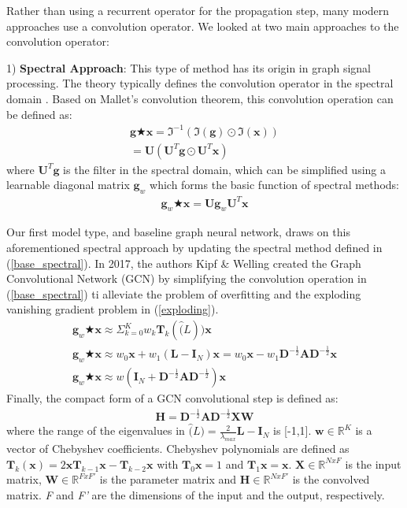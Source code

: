 \documentclass[sigconf, nonacm]{acmart}
\begin{document}
Rather than using a recurrent operator for the propagation step, many modern approaches use a convolution operator. We looked at two main approaches to the convolution operator:

1) \textbf{Spectral Approach}: This type of method has its origin in graph signal processing. The theory typically defines the convolution operator in the spectral domain \cite{Mallet1999}. Based on Mallet's convolution theorem, this convolution operation can be defined as:
\begin{align}
    \mathbf{g} \bigstar \mathbf{x} = \Im^{-1} ( \Im (\mathbf{g}) \odot \Im (\mathbf{x})) \\
    = \mathbf{U}(\mathbf{U}^T\mathbf{g} \odot \mathbf{U}^T\mathbf{x})
\end{align}
where $\mathbf{U}^T\mathbf{g}$ is the filter in the spectral domain, which can be simplified using a learnable diagonal matrix $\mathbf{g}_w$ which forms the basic function of spectral methods:
\begin{align}
    \mathbf{g}_w \bigstar \mathbf{x} = \mathbf{U}\mathbf{g}_w \mathbf{U}^T\mathbf{x}
    \label{base_spectral}
\end{align} 

Our first model type, and baseline graph neural network, draws on this aforementioned spectral approach by updating the spectral method defined in (\ref{base_spectral}). In 2017, the authors Kipf \& Welling created the Graph Convolutional Network (\textsc{GCN}) \cite{Kipf&Welling2017} by simplifying the convolution operation in (\ref{base_spectral}) ti alleviate the problem of overfitting and the exploding vanishing gradient problem in (\ref{exploding}). 
\begin{align}
    \mathbf{g}_w \bigstar \mathbf{x} \approx \Sigma^K_{k=0} w_k \mathbf{T}_k (\hat(L))\mathbf{x} \\
    \mathbf{g}_w \bigstar \mathbf{x} \approx w_0 \mathbf{x} + w_1(\mathbf{L}-\mathbf{I}_N)\mathbf{x} = w_0\mathbf{x} - w_1\mathbf{D}^{-\frac{1}{2}}\mathbf{A}\mathbf{D}^{-\frac{1}{2}}\mathbf{x} \\
    \mathbf{g}_w \bigstar \mathbf{x} \approx w(\mathbf{I}_N + \mathbf{D}^{-\frac{1}{2}}\mathbf{A}\mathbf{D}^{-\frac{1}{2}})\mathbf{x}
    \label{exploding}
\end{align} 
    Finally, the compact form of a \textsc{GCN} convolutional step is defined as:
\begin{align} 
    \mathbf{H} =  \mathbf{D}^{-\frac{1}{2}} \mathbf{A} \mathbf{D}^{-\frac{1}{2}} \mathbf{X} \mathbf{W}
    \label{GCN_eq}
\end{align} 
where the range of the eigenvalues in $\hat(L) = \frac{2}{\lambda_{max}}\mathbf{L} - \mathbf{I}_N$ is [-1,1]. $\mathbf{w} \in \mathbb{R}^K$ is a vector of Chebyshev coefficients. Chebyshev polynomials are defined as $\mathbf{T}_k (\mathbf{x}) = 2\mathbf{x}\mathbf{T}_{k-1} \mathbf{x} - \mathbf{T}_{k-2} \mathbf{x}$ with $\mathbf{T}_0\mathbf{x} = 1$ and $\mathbf{T}_1\mathbf{x} = \mathbf{x}$. $\mathbf{X} \in \mathbb{R}^{NxF}$ is the input matrix, $\mathbf{W} \in \mathbb{R}^{FxF'}$  is the parameter matrix and $\mathbf{H}  \in \mathbb{R}^{NxF'}$ is the convolved matrix. \textit{F} and \textit{F'} are the dimensions of the input and the output, respectively.
\end{document}
